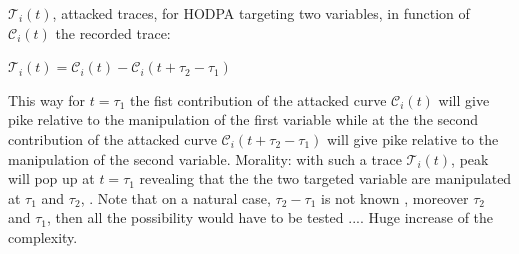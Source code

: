 $\mathcal{T}_i(t)$, attacked traces, for HODPA targeting two variables,
in function of $\mathcal{C}_i(t)$ the recorded trace:

\begin{center}
$ \mathcal{T}_i(t) = \mathcal{C}_i(t)  -  \mathcal{C}_i(t + \tau_2 -\tau_1) $
\end{center}

This way for $t = \tau_1$ the fist contribution of the attacked curve 
$\mathcal{C}_i(t) $ will give pike relative to the manipulation of the first variable while at the 
the second contribution of the attacked curve $ \mathcal{C}_i(t + \tau_2 -\tau_1)$ 
will give pike relative to the manipulation of the second variable.
Morality: with such a trace $\mathcal{T}_i(t)$, peak will pop up at $t =\tau_1$
revealing that the the two targeted variable are manipulated at $\tau_1$ and $\tau_2$, .
Note that on a natural case, $\tau_2 -\tau_1$ is not known , moreover  $\tau_2$  and $\tau_1$,
then all the possibility would have to be tested .... Huge increase of the complexity.



